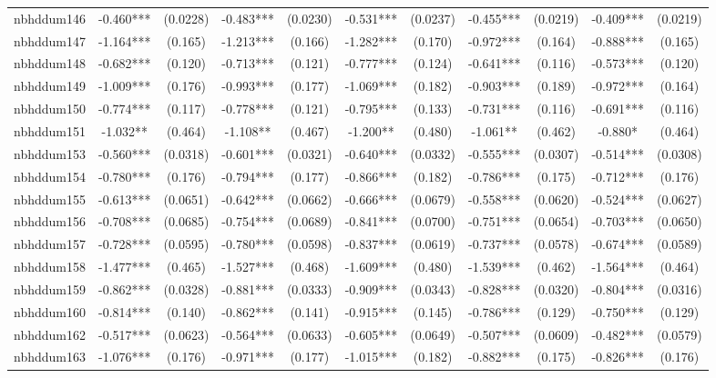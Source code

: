 \documentclass[]{article}
\begin{document}
\begin{tabular}{lcccccccccc}
nbhddum146 & -0.460*** & (0.0228) & -0.483*** & (0.0230) & -0.531*** & (0.0237) & -0.455*** & (0.0219) & -0.409*** & (0.0219) \\
nbhddum147 & -1.164*** & (0.165) & -1.213*** & (0.166) & -1.282*** & (0.170) & -0.972*** & (0.164) & -0.888*** & (0.165) \\
nbhddum148 & -0.682*** & (0.120) & -0.713*** & (0.121) & -0.777*** & (0.124) & -0.641*** & (0.116) & -0.573*** & (0.120) \\
nbhddum149 & -1.009*** & (0.176) & -0.993*** & (0.177) & -1.069*** & (0.182) & -0.903*** & (0.189) & -0.972*** & (0.164) \\
nbhddum150 & -0.774*** & (0.117) & -0.778*** & (0.121) & -0.795*** & (0.133) & -0.731*** & (0.116) & -0.691*** & (0.116) \\
nbhddum151 & -1.032** & (0.464) & -1.108** & (0.467) & -1.200** & (0.480) & -1.061** & (0.462) & -0.880* & (0.464) \\
nbhddum153 & -0.560*** & (0.0318) & -0.601*** & (0.0321) & -0.640*** & (0.0332) & -0.555*** & (0.0307) & -0.514*** & (0.0308) \\
nbhddum154 & -0.780*** & (0.176) & -0.794*** & (0.177) & -0.866*** & (0.182) & -0.786*** & (0.175) & -0.712*** & (0.176) \\
nbhddum155 & -0.613*** & (0.0651) & -0.642*** & (0.0662) & -0.666*** & (0.0679) & -0.558*** & (0.0620) & -0.524*** & (0.0627) \\
nbhddum156 & -0.708*** & (0.0685) & -0.754*** & (0.0689) & -0.841*** & (0.0700) & -0.751*** & (0.0654) & -0.703*** & (0.0650) \\
nbhddum157 & -0.728*** & (0.0595) & -0.780*** & (0.0598) & -0.837*** & (0.0619) & -0.737*** & (0.0578) & -0.674*** & (0.0589) \\
nbhddum158 & -1.477*** & (0.465) & -1.527*** & (0.468) & -1.609*** & (0.480) & -1.539*** & (0.462) & -1.564*** & (0.464) \\
nbhddum159 & -0.862*** & (0.0328) & -0.881*** & (0.0333) & -0.909*** & (0.0343) & -0.828*** & (0.0320) & -0.804*** & (0.0316) \\
nbhddum160 & -0.814*** & (0.140) & -0.862*** & (0.141) & -0.915*** & (0.145) & -0.786*** & (0.129) & -0.750*** & (0.129) \\
nbhddum162 & -0.517*** & (0.0623) & -0.564*** & (0.0633) & -0.605*** & (0.0649) & -0.507*** & (0.0609) & -0.482*** & (0.0579) \\
nbhddum163 & -1.076*** & (0.176) & -0.971*** & (0.177) & -1.015*** & (0.182) & -0.882*** & (0.175) & -0.826*** & (0.176) \\

\end{tabular}
\end{document}
